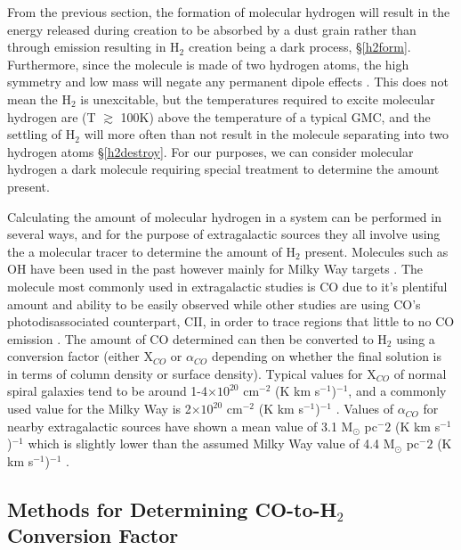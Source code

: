 From the previous section, the formation of molecular hydrogen will result in the energy released during creation to be absorbed by a dust grain rather than through emission resulting in H$_2$ creation being a dark process, \S\ref{h2form}.  Furthermore, since the molecule is made of two hydrogen atoms, the high symmetry and low mass will negate any permanent dipole effects \citep{bolatto2013,kennicutt2012}.  This does not mean the H$_2$ is unexcitable, but the temperatures required to excite molecular hydrogen are (T $\gtrsim$ 100K) above the temperature of a typical GMC\citep{bolatto2013}, and the settling of H$_2$ will more often than not result in the molecule separating into two hydrogen atoms \S\ref{h2destroy}.  For our purposes, we can consider molecular hydrogen a dark molecule requiring special treatment to determine the amount present.

Calculating the amount of molecular hydrogen in a system can be performed in several ways, and for the purpose of extragalactic sources they all involve using the  a molecular tracer to determine the amount of H$_2$ present.  Molecules such as OH have been used in the past however mainly for Milky Way targets \citep{barrett1964}.  The molecule most commonly used in extragalactic studies is CO due to it's plentiful amount and ability to be easily observed \citep{bolatto2013} while other studies are using CO's photodisassociated counterpart, CII, in order to trace regions that little to no CO emission \citep{madden1997}.  The amount of CO determined can then be converted to H$_2$ using a conversion factor (either X$_{CO}$ or $\alpha_{CO}$ depending on whether the final solution is in terms of column density or surface density).  Typical values for X$_{CO}$ of normal spiral galaxies tend to be around 1-4$\times 10^{20}$ cm$^{-2}$ (K km s$^{-1}$)$^{-1}$, and a commonly used value for the Milky Way is 2$\times 10^{20}$ cm$^{-2}$ (K km s$^{-1}$)$^{-1}$ \citep{bolatto2013}. Values of $\alpha_{CO}$ for nearby extragalactic sources have shown a mean value of 3.1 M$_\odot$ pc$^-2$ (K km s$^{-1}$)$^{-1}$ which is slightly lower than the assumed Milky Way value of 4.4 M$_\odot$ pc$^-2$ (K km s$^{-1}$)$^{-1}$ \citep{sandstrom2013}.

\subsection{Methods for Determining CO-to-H$_2$ Conversion Factor}

